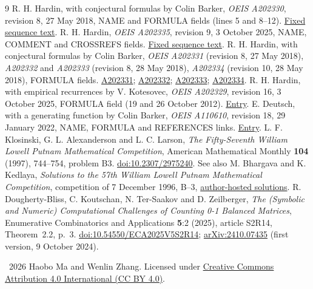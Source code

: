 \documentclass[11pt]{article}
\begin{document}
\begin{thebibliography}{9}
 R. H. Hardin, with conjectural formulas by Colin Barker,
\emph{OEIS A202330}, revision 8, 27 May 2018, NAME and FORMULA fields (lines 5 and 8--12).
\href{https://raw.githubusercontent.com/oeis/oeisdata/2066359a24c83163fd067fc54d1d20d143c5be69/seq/A202/A202330.seq}{Fixed sequence text}.
 R. H. Hardin, \emph{OEIS A202335}, revision 9, 3 October 2025, NAME, COMMENT and CROSSREFS fields.
\href{https://raw.githubusercontent.com/oeis/oeisdata/2066359a24c83163fd067fc54d1d20d143c5be69/seq/A202/A202335.seq}{Fixed sequence text}.
 R. H. Hardin, with conjectural formulas by Colin Barker,
\emph{OEIS A202331} (revision 8, 27 May 2018), \emph{A202332} and \emph{A202333} (revision 8, 28 May 2018), \emph{A202334} (revision 10, 28 May 2018), FORMULA fields.
\href{https://oeis.org/A202331/internal}{A202331};
\href{https://oeis.org/A202332/internal}{A202332};
\href{https://oeis.org/A202333/internal}{A202333};
\href{https://oeis.org/A202334/internal}{A202334}.
 R. H. Hardin, with empirical recurrences by V. Kotesovec,
\emph{OEIS A202329}, revision 16, 3 October 2025, FORMULA field (19 and 26 October 2012).
\href{https://oeis.org/A202329/internal}{Entry}.
 E. Deutsch, with a generating function by Colin Barker,
\emph{OEIS A110610}, revision 18, 29 January 2022, NAME, FORMULA and REFERENCES links.
\href{https://oeis.org/A110610/internal}{Entry}.
 L. F. Klosinski, G. L. Alexanderson and L. C. Larson,
\emph{The Fifty-Seventh William Lowell Putnam Mathematical Competition},
American Mathematical Monthly \textbf{104} (1997), 744--754, problem B3.
\href{https://doi.org/10.2307/2975240}{doi:10.2307/2975240}.
See also M. Bhargava and K. Kedlaya, \emph{Solutions to the 57th William Lowell Putnam Mathematical Competition}, competition of 7 December 1996, B--3,
\href{https://kskedlaya.org/putnam-archive/1996s.pdf}{author-hosted solutions}.
 R. Dougherty-Bliss, C. Koutschan, N. Ter-Saakov and D. Zeilberger,
\emph{The (Symbolic and Numeric) Computational Challenges of Counting 0-1 Balanced Matrices},
Enumerative Combinatorics and Applications \textbf{5}:2 (2025), article S2R14, Theorem~2.2, p.~3.
\href{https://doi.org/10.54550/ECA2025V5S2R14}{doi:10.54550/ECA2025V5S2R14};
\href{https://arxiv.org/abs/2410.07435}{arXiv:2410.07435} (first version, 9 October 2024).
\end{thebibliography}
\medskip
\noindent\small\textcopyright\ 2026 Haobo Ma and Wenlin Zhang.
Licensed under \href{https://creativecommons.org/licenses/by/4.0/}{Creative Commons Attribution 4.0 International (CC BY 4.0)}.
\end{document}
